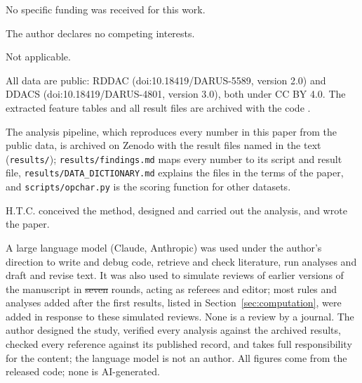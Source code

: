 \documentclass[pdflatex,sn-basic,lineno]{sn-jnl}
\providecommand{\DIFadd}[1]{{\protect\color{blue}\uwave{#1}}} %
\providecommand{\DIFdel}[1]{{\protect\color{red}\sout{#1}}}                      %
\providecommand{\DIFaddbegin}{} %
\providecommand{\DIFaddend}{} %
\providecommand{\DIFdelbegin}{} %
\providecommand{\DIFdelend}{} %
\newcommand{\DIFscaledelfig}{0.5}
\newlength{\DIFdelgraphicswidth} %
\newlength{\DIFdelgraphicsheight} %
\newcommand{\DIFaddincludegraphics}[2][]{{\color{blue}\fbox{\DIFOincludegraphics[#1]{#2}}}} %
\newcommand{\DIFdelincludegraphics}[2][]{%
\sbox{\DIFdelgraphicsbox}{\DIFOincludegraphics[#1]{#2}}%
\settoboxwidth{\DIFdelgraphicswidth}{\DIFdelgraphicsbox} %
\settoboxtotalheight{\DIFdelgraphicsheight}{\DIFdelgraphicsbox} %
\scalebox{\DIFscaledelfig}{%
\parbox[b]{\DIFdelgraphicswidth}{\usebox{\DIFdelgraphicsbox}\\[-\baselineskip] \rule{\DIFdelgraphicswidth}{0em}}\llap{\resizebox{\DIFdelgraphicswidth}{\DIFdelgraphicsheight}{%
\setlength{\unitlength}{\DIFdelgraphicswidth}%
\begin{picture}(1,1)%
\thicklines\linethickness{2pt} %
{\color[rgb]{1,0,0}\put(0,0){\framebox(1,1){}}}%
{\color[rgb]{1,0,0}\put(0,0){\line( 1,1){1}}}%
{\color[rgb]{1,0,0}\put(0,1){\line(1,-1){1}}}%
\end{picture}%
}\hspace*{3pt}}} %
} %
\DeclareRobustCommand{\DIFaddbegin}{\DIFOaddbegin \let\includegraphics\DIFaddincludegraphics} %
\DeclareRobustCommand{\DIFaddend}{\DIFOaddend \let\includegraphics\DIFOincludegraphics} %
\DeclareRobustCommand{\DIFdelbegin}{\DIFOdelbegin \let\includegraphics\DIFdelincludegraphics} %
\DeclareRobustCommand{\DIFdelend}{\DIFOaddend \let\includegraphics\DIFOincludegraphics} %
\begin{document}
No specific funding was received for this work.

The author declares no competing interests.

Not applicable.

All data are public: RDDAC (doi:10.18419/DARUS-5589, version 2.0) and DDACS (doi:10.18419/DARUS-4801, version 3.0), both under CC BY 4.0. The extracted feature tables and all result files are archived with the code \citep{canseven2026archive}.

The analysis pipeline, which reproduces every number in this paper from the public data, is archived on Zenodo \citep{canseven2026archive} with the result files named in the text (\texttt{results/}); \texttt{results/findings.md} maps every number to its script and result file, \texttt{results/DATA\_DICTIONARY.md} explains the files in the terms of the paper, and \texttt{scripts/opchar.py} is the scoring function for other datasets.

H.T.C. conceived the method, designed and carried out the analysis, and wrote the paper.

A large language model (Claude, Anthropic) was used under the author's direction to write and debug code, retrieve and check literature, run analyses and draft and revise text. It was also used to simulate reviews of earlier versions of the manuscript in \DIFdelbegin \DIFdel{seven }\DIFdelend \DIFaddbegin \DIFadd{eight }\DIFaddend rounds, acting as referees and editor; most rules and analyses added after the first results, listed in Section~\ref{sec:computation}, were added in response to these simulated reviews. None is a review by a journal. The author designed the study, verified every analysis against the archived results, checked every reference against its published record, and takes full responsibility for the content; the language model is not an author. All figures come from the released code; none is AI-generated.


\FloatBarrier
{\small
}
\end{document}
